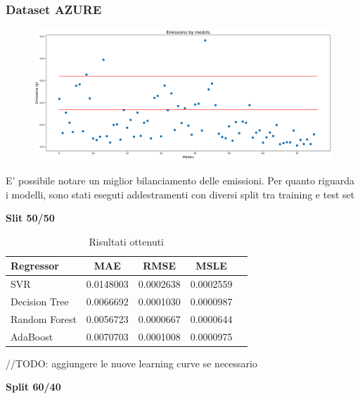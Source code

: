 \subsubsection{Dataset AZURE}

\begin{figure}[H]
    \centering
    \includegraphics[scale=1.25]{images/nuova-situazione2-ridotto.png}
\end{figure}


E’ possibile notare un miglior bilanciamento delle emissioni. Per quanto riguarda i modelli,
sono stati eseguti addestramenti con diversi split tra training e test set


\textbf{Slit 50/50}


\begin{table}[H]
    \centering
    \begin{tabular}{|>{\centering\arraybackslash}m{5cm}|c|c|c|c|}
        \hline
        \textbf{Regressor} & \textbf{MAE} & \textbf{RMSE} & \textbf{MSLE} \\ [10pt]
        \hline
        SVR & 0.0148003 & 0.0002638 & 0.0002559 \\ [10pt]
        \hline
        Decision Tree & 0.0066692 & 0.0001030 & 0.0000987 \\ [10pt]
        \hline
        Random Forest & 0.0056723 & 0.0000667 & 0.0000644 \\ [10pt]
        \hline
        AdaBoost & 0.0070703 & 0.0001008 & 0.0000975 \\ [10pt]
        \hline
    \end{tabular}
    \caption*{Risultati ottenuti}
    \label{tab:results}
\end{table}

//TODO: aggiungere le nuove learning curve se necessario

\textbf{Split 60/40}



